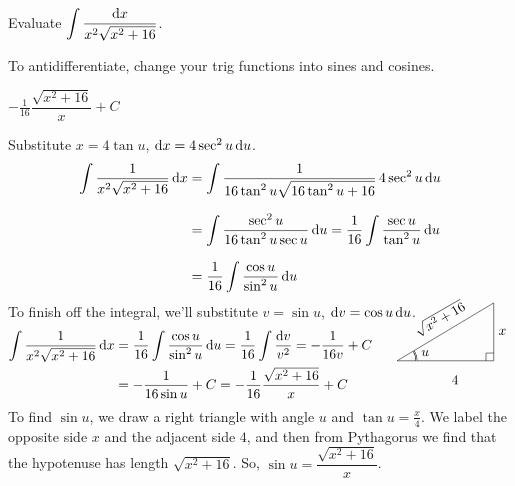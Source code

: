\begin{question}[2014D]
Evaluate $\displaystyle\int\frac{\mathrm{d}x}{x^2\sqrt{x^2+16}}$.
\end{question}

\begin{hint}
To antidifferentiate, change your trig functions into sines and cosines.
\end{hint}

\begin{answer}
$-\displaystyle\frac{1}{16}\dfrac{\sqrt{x^2+16}}{x}+C$
\end{answer}

\begin{solution}
Substitute $x=4\tan u$, $\mathrm{d}x=4 \sec^2u\,\mathrm{d}u$.
\begin{align*}
\int\frac{1}{x^2\sqrt{x^2+16}}\,\mathrm{d}x
&=\int \frac{1}{16\tan^2 u \sqrt{16\tan^2 u+16}}\,4\sec^2 u\,\mathrm{d}u   \\[0.1in]
&=\int \frac{\sec^2u}{16\tan^2u\sec u}\,\mathrm{d}u
=\frac{1}{16}\int \frac{\sec u}{\tan^2u}\,\mathrm{d}u \\[0.1in]
&= \frac{1}{16}\int\frac{\cos u}{\sin^2 u}\,\mathrm{d}u
\end{align*}
To finish off the integral, we'll substitute $v=\sin u$,
$\mathrm{d}v=\cos u\,\mathrm{d}u$.
\begin{align*}
\int\frac{1}{x^2\sqrt{x^2+16}}\,\dee{x}
&=\frac{1}{16} \int\frac{\cos u}{\sin^2 u}\,\dee{u}
= \frac{1}{16}\int\frac{\dee{v}}{v^2}
=-\frac{1}{16v} +C \\
&=-\frac{1}{16\sin u} +C
=-\frac{1}{16}\dfrac{\sqrt{x^2+16}}{x}+C
\hskip0.5in\smash{
\trigtri{u}{4}{x}{\sqrt{x^2+16}}
}
\end{align*}
To find $\sin u$, we draw a right triangle with angle $u$ and $\tan u = \frac{x}{4}$. We label the opposite side $x$ and the adjacent side $4$, and then from Pythagorus we find that the hypotenuse has length $\sqrt{x^2+16}$. So, $\sin u = \dfrac{\sqrt{x^2+16}}{x}$.
\end{solution}







